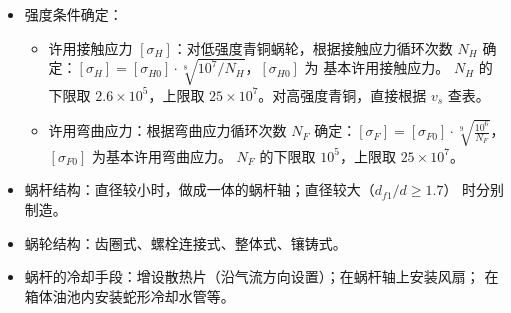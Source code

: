\documentclass[12pt,a4paper]{article}
\newcommand{\tightlist}{\setlength{\parskip}{0pt}\setlength{\itemsep}{0pt}}
\newcommand{\hint}[1]{\textsf{（#1）}}
\newcommand{\minor}[1]{{\color{gray} #1}}
\begin{document}
\begin{itemize}
\begin{itemize}
\begin{equation}
        \end{equation}
        设计公式为
        \begin{equation}
        m^2d_1\geq\frac{2000KT_2Y_{Fa2}}{z_2[\sigma_F]\cos\gamma}.
        \end{equation}
        其中的齿形系数 $Y_{Fa2}$ 可按当量齿数 $z_{v2}=\frac{z_2}{\cos^3\gamma}$
        查表。
        \item 热平衡计算：验算温升
        \begin{equation}
        \Delta t=\frac{1000P(1-\eta)}{K_tA}\leq[\Delta t]
        \end{equation}
        其中 $P$ 为功率，$A$ 为散热面积\hint{一般估计为散热片表面积的一半}，$K_t$ 为
        散热系数\hint{ 一般取 10 -- \SI{17}{J/(n^2.s.\celsius)}}；许用温升 $[\Delta
        t]$ 为 30 -- \SI{40}\celsius，且油温应小于 \SI{80}\celsius。
    \end{itemize}
    \item 强度条件确定：
    \begin{itemize}\tightlist
        \item 许用接触应力 $[\sigma_H]$：对低强度青铜蜗轮，根据接触应力循环次数 $N_H$
        确定：$[\sigma_H]=[\sigma_{H0}]\cdot\sqrt[8]{10^7/N_H}$，$[\sigma_{H0}]$ 为
        基本许用接触应力。\minor{$N_H$ 的下限取 $2.6\times10^5$，上限取 $25\times
        10^7$。}对高强度青铜，直接根据 $v_s$ 查表。
        \item 许用弯曲应力：根据弯曲应力循环次数 $N_F$ 确定：$[\sigma_F]=[\sigma_{F0}]
        \cdot\sqrt[9]{\frac{10^6}{N_F}}$，$[\sigma_{F0}]$ 为基本许用弯曲应力。\minor{
        $N_F$ 的下限取 $10^5$，上限取 $25\times10^7$。}
    \end{itemize}
    \item 蜗杆结构：直径较小时，做成一体的蜗杆轴；直径较大\hint{$d_{f1}/d\geq1.7$}
    时分别制造。
    \item \minor{蜗轮结构：齿圈式、螺栓连接式、整体式、镶铸式。}
    \item \minor{蜗杆的冷却手段：增设散热片\hint{沿气流方向设置}；在蜗杆轴上安装风扇；
    在箱体油池内安装蛇形冷却水管等。}
\end{itemize}
\end{document}

